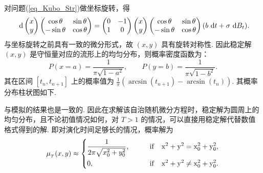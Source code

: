 对问题(\ref{eq_Kubo_Str})做坐标旋转，得
\[
\text{ d} 
\begin{pmatrix} x\\y\end{pmatrix}
\begin{pmatrix} \cos \theta & \sin \theta \\ -\sin \theta & \cos \theta \end{pmatrix}
= 
\begin{pmatrix} 0&-1 \\  1&0	\end{pmatrix} 
\begin{pmatrix} x \\ y	\end{pmatrix} 
\begin{pmatrix} \cos \theta & \sin \theta \\ -\sin \theta & \cos \theta \end{pmatrix}
(b \text{ d} t + \sigma \text{ d} B_t).
\]
与坐标旋转之前具有一致的微分形式，故 $(x,y)$ 具有旋转对称性. 因此稳定解 $(x,y)$ 是守恒量对应的流形上的均匀分布，则概率密度函数为：
\[
P (x=a) = \frac{1}{\pi\sqrt{1-a^2}},\qquad P(y=b) = \frac{1}{\pi\sqrt{1-b^2}}.
\]
其在区间 $[t_n,t_{n+1}]$ 上的概率值为 $\frac1\pi\left(\operatorname{arcsin}(t_{n+1}) - \operatorname{arcsin}{(t_{n})}\right)$. 其概率分布柱状图如下. 
\begin{figure}[!htbp]
	\centering 
	\vspace{.2cm}
	\label{fig.6.10}
\end{figure}
与模拟的结果也是一致的. 因此在求解该自治随机微分方程时，稳定解为圆周上的均匀分布，且不论初值情况如何，对 $T>1$ 的情况，可以直接用稳定解代替数值格式得到的解. 
即对演化时间足够长的情况，概率解为
\begin{equation}
\mu_{_T}(x,y) \approx
\left\{
\begin{aligned}
&\frac1{2\pi \sqrt{x_0^2+y_0^2}}, \qquad  & \rm{if}\quad x^2+y^2=x_0^2+y_0^2,\\
& 0,\qquad  & \rm{if}\quad x^2+y^2\neq x_0^2+y_0^2 .
\end{aligned}
\right.
\end{equation}

